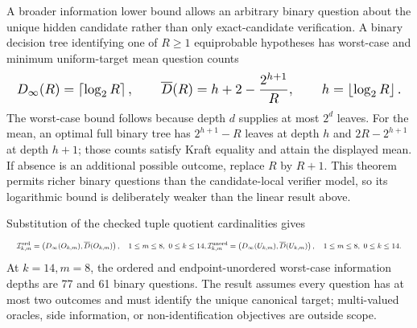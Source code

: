 \documentclass{article}
\newcommand{\fitmath}[1]{\resizebox{0.99\linewidth}{!}{$\displaystyle #1$}}
\begin{document}
A broader information lower bound allows an arbitrary binary question about the
unique hidden candidate rather than only exact-candidate verification. A binary
decision tree identifying one of $R\geq1$ equiprobable hypotheses has worst-case
and minimum uniform-target mean question counts
\begin{equation}
  \fitmath{%
    D_\infty(R)=\left\lceil\log_2 R\right\rceil,\qquad
    \overline D(R)=h+2-\frac{2^{h+1}}{R},\qquad
    h=\left\lfloor\log_2 R\right\rfloor.
  }
  \label{eq:optimization-binary-oracle-identification-lower-bound}
\end{equation}
The worst-case bound follows because depth $d$ supplies at most $2^d$ leaves.
For the mean, an optimal full binary tree has
$2^{h+1}-R$ leaves at depth $h$ and $2R-2^{h+1}$ at depth $h+1$; those counts
satisfy Kraft equality and attain the displayed mean. If absence is an
additional possible outcome, replace $R$ by $R+1$. This theorem permits richer
binary questions than the candidate-local verifier model, so its logarithmic
bound is deliberately weaker than the linear result above.

Substitution of the checked tuple quotient cardinalities gives
\begin{equation}
  \fitmath{%
    \mathcal I^{\rm ord}_{k,m}
      =\left(D_\infty(O_{k,m}),\overline D(O_{k,m})\right),
      \quad 1\leq m\leq8,\ 0\leq k\leq14,\\
    \mathcal I^{\rm unord}_{k,m}
      =\left(D_\infty(U_{k,m}),\overline D(U_{k,m})\right),
      \quad 1\leq m\leq8,\ 0\leq k\leq14.
  }
  \label{eq:optimization-crazy-profile-tuple-binary-oracle-lower-bound}
\end{equation}
At $k=14,m=8$, the ordered and endpoint-unordered worst-case information depths
are 77 and 61 binary questions. The result assumes every question has at most
two outcomes and must identify the unique canonical target; multi-valued
oracles, side information, or non-identification objectives are outside scope.
\end{document}
